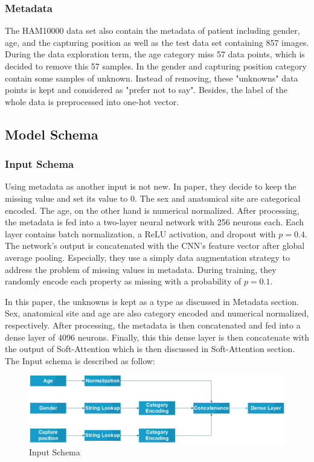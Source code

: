 \documentclass[sensors,article,submit,pdftex,moreauthors]{Definitions/mdpi}
\begin{document}
\subsubsection{Metadata}
The HAM10000 data set\cite{10417} also contain the metadata of patient including gender, age, and the capturing position as well as the test data set containing 857 images. During the data exploration term, the age category miss 57 data points, which is decided to remove this 57 samples. In the gender and capturing position category contain some samples of unknown. Instead of removing, these "unknowns" data points is kept and considered as "prefer not to say". Besides, the label of the whole data is preprocessed into one-hot vector.
\subsection{Model Schema}
\subsubsection{Input Schema}
Using metadata as another input is not new. In paper\cite{03910}, they decide to keep the missing value and set its value to $0$. The sex and anatomical site are categorical encoded. The age, on the other hand is numerical normalized. After processing, the metadata is fed into a two-layer neural network with 256 neurons each. Each layer contains batch normalization, a ReLU\cite{08375} activation, and dropout with $p = 0.4$. The network’s output is concatenated with the CNN’s feature vector after global average pooling. Especially, they use a simply data augmentation strategy to address the problem of missing values in metadata. During training, they randomly encode each property as missing with a probability of $p = 0.1$. 

In this paper, the unknowns is kept as a type as discussed in Metadata section. Sex, anatomical site and age are also category encoded and numerical normalized, respectively. After processing, the metadata is then concatenated and fed into a dense layer of 4096 neurons. Finally, this this dense layer is then concatenate with the output of Soft-Attention which is then discussed in Soft-Attention section. The Input schema is described as follow:

\begin{figure}[H]
	\centering
	\includegraphics[width=1\linewidth]{"Definitions/Input Schema"}
	\caption{Input Schema}
	\label{fig:input-schema}
\end{figure}
\end{document}
